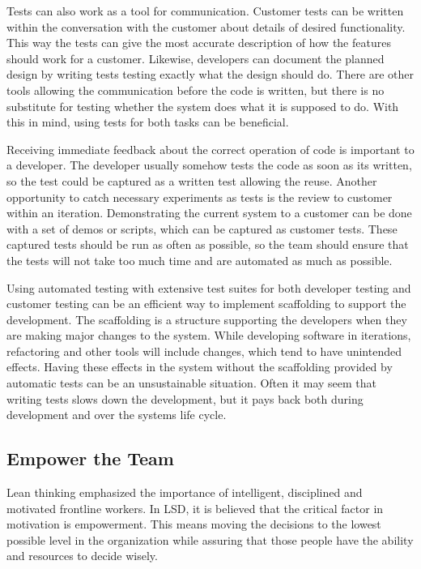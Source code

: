 Tests can also work as a tool for communication. Customer tests can be written within the conversation with the customer about details of desired functionality. This way the tests can give the most accurate description of how the features should work for a customer. Likewise, developers can document the planned design by writing tests testing exactly what the design should do. There are other tools allowing the communication before the code is written, but there is no substitute for testing whether the system does what it is supposed to do. With this in mind, using tests for both tasks can be beneficial.

Receiving immediate feedback about the correct operation of code is important to a developer. The developer usually somehow tests the code as soon as its written, so the test could be captured as a written test allowing the reuse. Another opportunity to catch necessary experiments as tests is the review to customer within an iteration. Demonstrating the current system to a customer can be done with a set of demos or scripts, which can be captured as customer tests. These captured tests should be run as often as possible, so the team should ensure that the tests will not take too much time and are automated as much as possible.

Using automated testing with extensive test suites for both developer testing and customer testing can be an efficient way to implement scaffolding to support the development. The scaffolding is a structure supporting the developers when they are making major changes to the system. While developing software in iterations, refactoring and other tools will include changes, which tend to have unintended effects. Having these effects in the system without the scaffolding provided by automatic tests can be an unsustainable situation. Often it may seem that writing tests slows down the development, but it pays back both during development and over the systems life cycle.

\subsection{Empower the Team}

Lean thinking emphasized the importance of intelligent, disciplined and motivated frontline workers. In LSD, it is believed that the critical factor in motivation is empowerment. This means moving the decisions to the lowest possible level in the organization while assuring that those people have the ability and resources to decide wisely.

